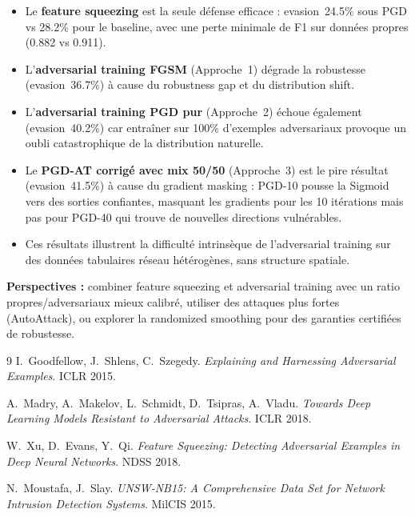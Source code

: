 \documentclass[11pt,a4paper]{article}
\begin{document}
\begin{itemize}[leftmargin=1.5em, noitemsep]
    \item Le \textbf{feature squeezing} est la seule d\'efense efficace : evasion~24.5\% sous PGD
    vs 28.2\% pour le baseline, avec une perte minimale de F1 sur donn\'ees propres (0.882 vs 0.911).
    \item L'\textbf{adversarial training FGSM} (Approche~1) d\'egrade la robustesse (evasion~36.7\%)
    \`a cause du robustness gap et du distribution shift.
    \item L'\textbf{adversarial training PGD pur} (Approche~2) \'echoue \'egalement (evasion~40.2\%)
    car entra\^iner sur 100\% d'exemples adversariaux provoque un oubli catastrophique de la distribution naturelle.
    \item Le \textbf{PGD-AT corrig\'e avec mix 50/50} (Approche~3) est le pire r\'esultat (evasion~41.5\%)
    \`a cause du gradient masking : PGD-10 pousse la Sigmoid vers des sorties confiantes, masquant les gradients
    pour les 10 it\'erations mais pas pour PGD-40 qui trouve de nouvelles directions vuln\'erables.
    \item Ces r\'esultats illustrent la difficult\'e intrins\`eque de l'adversarial training
    sur des donn\'ees tabulaires r\'eseau h\'et\'erog\`enes, sans structure spatiale.
\end{itemize}

\textbf{Perspectives :} combiner feature squeezing et adversarial training avec un ratio propres/adversariaux
mieux calibr\'e, utiliser des attaques plus fortes (AutoAttack), ou explorer la randomized smoothing
pour des garanties certifi\'ees de robustesse.

\vspace{1em}

\begin{thebibliography}{9}
I.~Goodfellow, J.~Shlens, C.~Szegedy.
\textit{Explaining and Harnessing Adversarial Examples}.
ICLR 2015.

A.~Madry, A.~Makelov, L.~Schmidt, D.~Tsipras, A.~Vladu.
\textit{Towards Deep Learning Models Resistant to Adversarial Attacks}.
ICLR 2018.

W.~Xu, D.~Evans, Y.~Qi.
\textit{Feature Squeezing: Detecting Adversarial Examples in Deep Neural Networks}.
NDSS 2018.

N.~Moustafa, J.~Slay.
\textit{UNSW-NB15: A Comprehensive Data Set for Network Intrusion Detection Systems}.
MilCIS 2015.
\end{thebibliography}
\end{document}
